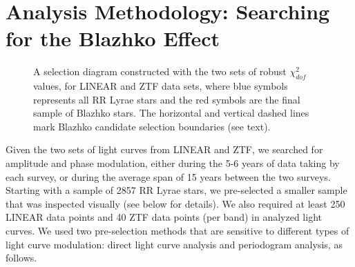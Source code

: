 \section{Analysis Methodology: Searching for the Blazhko Effect  \label{sec:analysis}}  

\begin{figure}[ht]
\caption{A selection diagram constructed with the two sets of robust $\chi^2_{dof}$ values, for LINEAR and ZTF data sets, where
  blue symbols represents all RR Lyrae stars and the red symbols are the final sample of Blazhko stars. The horizontal
  and vertical dashed lines mark Blazhko candidate selection boundaries (see text).}
\label{fig:chi2}
\end{figure}


Given the two sets of light curves from LINEAR and ZTF, we searched for amplitude and phase modulation,
either during the 5-6 years of data taking by each survey, or during the average span of 15 years between the two
surveys. Starting with a sample of 2857 RR Lyrae stars, we pre-selected a smaller sample that was inspected
visually (see below for details). We also required at least 250 LINEAR data points and 40 ZTF data points (per band)
in analyzed light curves. We used two pre-selection methods that are sensitive to different types of light curve
modulation: direct light curve analysis and periodogram analysis, as follows.
 

